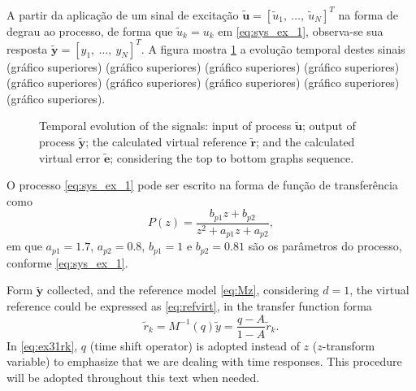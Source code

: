 \begin{exmp}
   
   A partir da aplicação de um sinal de excitação  $\tilde{\bm{u}}=[\tilde{u}_1,\ \dots,\ \tilde{u}_N]^T$ na forma de degrau ao processo, de forma que $\tilde{u}_k = u_k$ em \eqref{eq:sys_ex_1}, observa-se sua resposta $\tilde{\bm{y}} = [y_1,\ \dots,\ y_N]^T$. A figura  mostra \ref{fig:u_y_til_VRFT} a evolução temporal destes sinais (gráfico superiores) (gráfico superiores) (gráfico superiores) (gráfico superiores) (gráfico superiores) (gráfico superiores) (gráfico superiores) (gráfico superiores) (gráfico superiores).%
   \begin{figure}[htpb]
      \footnotesize
      \centering
      
      \caption{Temporal evolution of the signals: input of process $\tilde{\bm{u}}$; output of process $\tilde{\bm{y}}$; the calculated virtual reference $\tilde{\bm{r}}$; and the calculated virtual error $\tilde{\bm{e}}$; considering the top to bottom graphs sequence.}
      \label{fig:u_y_til_VRFT}
   \end{figure}
   O processo \eqref{eq:sys_ex_1} pode ser escrito na forma de função de transferência como
   \begin{equation}
      P(z) = \frac{b_{p 1}z + b_{p 2} }{z^2 + a_{p 1}z + a_{p 2}},
      \label{eq:ex31.Pz}
   \end{equation}
   em que $a_{p 1}=1.7$, $a_{p 2}=0.8$, $b_{p 1} = 1$ e $b_{p 2}=0.81$ são os parâmetros do processo, conforme \eqref{eq:sys_ex_1}.

   Form $\tilde{\bm{y}}$ collected, and the reference model \eqref{eq:Mz}, considering $d=1$,  the virtual  reference could be expressed as \eqref{eq:refvirt}, in the transfer function forma
   \begin{equation}
      \tilde{r}_k = M^{-1}(q) \tilde{y} = \frac{q-A}{1-A} \tilde{r}_k.
   \label{eq:ex31rk}
   \end{equation}
   In \eqref{eq:ex31rk}, $q$ (time shift operator) is adopted instead of $z$ ($z$-transform variable) to emphasize that we are dealing with time responses. This procedure will be adopted throughout this text when needed.


\end{exmp}
